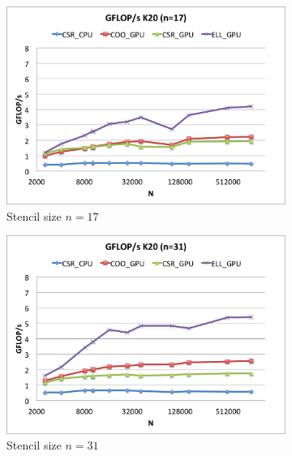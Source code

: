 \documentclass{report}
\begin{document}
\begin{figure} 
\centering
\begin{subfigure}[t]{0.48\textwidth}
\centering
\includegraphics[width=\textwidth]{gpu_content/cascade_spmv/gflops_cascade_k20_n17.png}
\caption{Stencil size $n=17$}
\label{fig:gflops_cascade_k20_n17}
\end{subfigure}
\quad
\begin{subfigure}[t]{0.48\textwidth}
\centering
\includegraphics[width=\textwidth]{gpu_content/cascade_spmv/gflops_cascade_k20_n31.png}
\caption{Stencil size $n=31$}
\label{fig:gflops_cascade_k20_n31}
\end{subfigure}
\begin{subfigure}[t]{0.48\textwidth}
\centering

\end{subfigure}
\end{figure}
\end{document}
